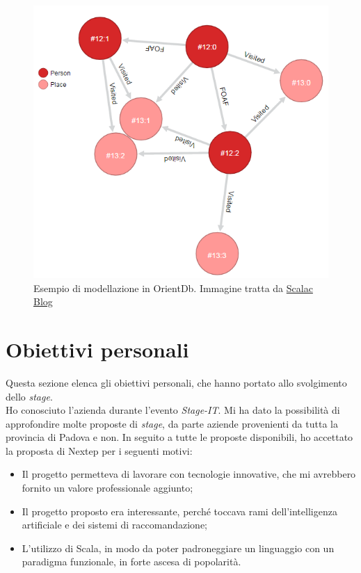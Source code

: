 \begin{figure}[ht]
\centering
\includegraphics[scale=0.60]{immagini/graph_orientdb}
\caption{Esempio di modellazione in OrientDb. Immagine tratta da \href{http://blog.scalac.io/2015/11/26/orientdb-and-scala-part1.html}{Scalac Blog}}
\label{fig:orientdb-graph}
\end{figure}




\section{Obiettivi personali}
Questa sezione elenca gli obiettivi personali, che hanno portato allo svolgimento dello \emph{stage}.\\Ho conosciuto l'azienda durante l'evento \emph{Stage-IT}. Mi ha dato la possibilità di approfondire molte proposte di \emph{stage}, da parte aziende provenienti da tutta la provincia di Padova e non. In seguito a tutte le proposte disponibili, ho accettato la proposta di Nextep per i seguenti motivi:
\begin{itemize}
\item Il progetto permetteva di lavorare con tecnologie innovative, che mi avrebbero fornito un valore professionale aggiunto;
\item Il progetto proposto era interessante, perché toccava rami dell'intelligenza artificiale e dei sistemi di raccomandazione;
\item L'utilizzo di Scala, in modo da poter padroneggiare un linguaggio con un paradigma funzionale, in forte ascesa di popolarità.
\end{itemize}
